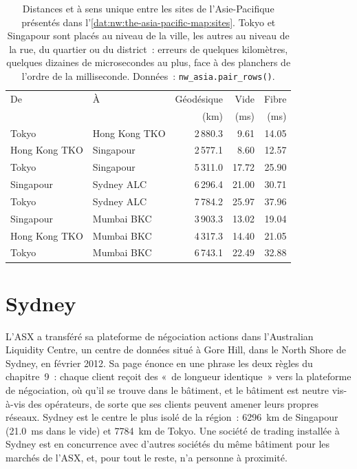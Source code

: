 \begin{table}[ht]
\centering\small
\begin{tabular}{llrrr}
\toprule
De & À & Géodésique & Vide & Fibre \\
 & & (km) & (ms) & (ms) \\
\midrule
Tokyo & Hong Kong TKO & 2\,880.3 & 9.61 & 14.05 \\
Hong Kong TKO & Singapour & 2\,577.1 & 8.60 & 12.57 \\
Tokyo & Singapour & 5\,311.0 & 17.72 & 25.90 \\
Singapour & Sydney ALC & 6\,296.4 & 21.00 & 30.71 \\
Tokyo & Sydney ALC & 7\,784.2 & 25.97 & 37.96 \\
Singapour & Mumbai BKC & 3\,903.3 & 13.02 & 19.04 \\
Hong Kong TKO & Mumbai BKC & 4\,317.3 & 14.40 & 21.05 \\
Tokyo & Mumbai BKC & 6\,743.1 & 22.49 & 32.88 \\
\bottomrule
\end{tabular}
\caption{Distances et  à sens unique entre les sites de l'Asie-Pacifique présentés dans l'\cref{dat:nw:the-asia-pacific-map:sites}. Tokyo et Singapour
sont placés au niveau de la ville, les autres au niveau de la rue, du quartier ou du district~: erreurs de quelques kilomètres, quelques dizaines de microsecondes au plus, face à
des planchers de l'ordre de la milliseconde. Données~: \texttt{nw\_asia.pair\_rows()}.}\label{tab:nw:the-asia-pacific-map:pairs}
\end{table}

\section{Sydney}

L'ASX a transféré sa plateforme de négociation actions dans l'Australian Liquidity Centre, un centre de données situé à Gore Hill, dans le North Shore de Sydney, en
février 2012. Sa page énonce en une phrase les deux règles du chapitre~9~: chaque client reçoit des  «~de longueur identique~» vers la
plateforme de négociation, où qu'il se trouve dans le bâtiment, et le bâtiment est neutre vis-à-vis des opérateurs, de sorte que ses clients peuvent amener leurs propres réseaux.
Sydney est le centre le plus isolé de la région~: \qty{6296}{\kilo\metre} de Singapour (\qty{21.0}{\milli\second} dans le vide) et
\qty{7784}{\kilo\metre} de Tokyo. Une société de trading installée à Sydney est en concurrence avec d'autres sociétés du même bâtiment pour les marchés de l'ASX, et, pour tout le reste, n'a personne à proximité.
%

